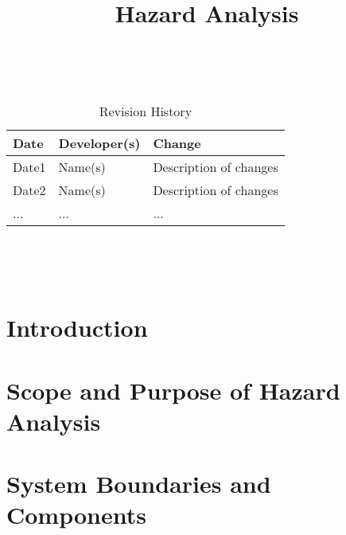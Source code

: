 \documentclass{article}
\title{Hazard Analysis\\\progname}
\author{\authname}
\date{}
\begin{document}
\maketitle
\thispagestyle{empty}

~\newpage


\begin{table}[hp]
\caption{Revision History} \label{TblRevisionHistory}
\begin{tabularx}{\textwidth}{llX}
\toprule
\textbf{Date} & \textbf{Developer(s)} & \textbf{Change}\\
\midrule
Date1 & Name(s) & Description of changes\\
Date2 & Name(s) & Description of changes\\
... & ... & ...\\
\bottomrule
\end{tabularx}
\end{table}

~\newpage

\tableofcontents

~\newpage



\section{Introduction}


\section{Scope and Purpose of Hazard Analysis}


\section{System Boundaries and Components}
\end{document}
